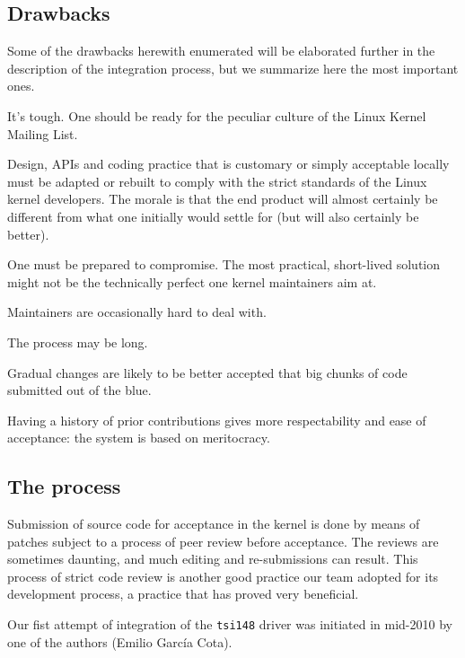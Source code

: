 \documentclass{JAC2003}
\begin{document}
\subsection{Drawbacks}

Some of the drawbacks herewith enumerated will be elaborated further in
the description of the integration process, but we summarize here the most
important ones.

\begin{Itemize}
\item It's tough. One should be ready for the peculiar culture of the
    Linux Kernel Mailing List.
\item Design, APIs and coding practice that is customary or simply
    acceptable locally must be adapted or rebuilt to comply with the strict
    standards of the Linux kernel developers. The morale is that the end
    product will almost certainly be different from what one initially would
    settle for (but will also certainly be better).
\item One must be prepared to compromise. The most practical,
    short-lived solution might not be the technically perfect one kernel
    maintainers aim at.
\item Maintainers are occasionally hard to deal with.
\item The process may be long.
\item Gradual changes are likely to be better accepted that big chunks
    of code submitted out of the blue.
\item Having a history of prior contributions gives more respectability
    and ease of acceptance: the system is based on meritocracy.
\end{Itemize}

\subsection{The process}

Submission of source code for acceptance in the kernel is done by means of
patches subject to a process of peer review before acceptance. The reviews
are sometimes daunting, and much editing and re-submissions can result. This
process of strict code review is another good practice our team adopted for
its development process, a practice that has proved very beneficial.

Our fist attempt of integration of the \verb|tsi148| driver was initiated
in mid-2010 by one of the authors (Emilio Garc\'ia Cota).
\end{document}
